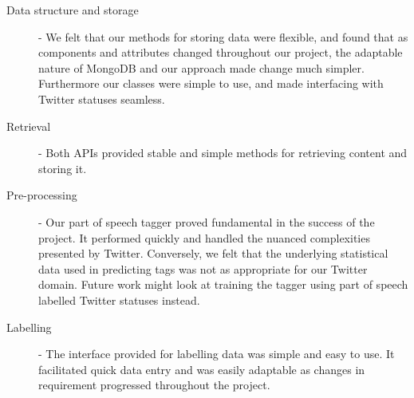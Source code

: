 \begin{description}
	\item [Data structure and storage] - We felt that our methods for storing data were flexible, and found that as components and attributes changed throughout our project, the adaptable nature of MongoDB and our approach made change much simpler. Furthermore our classes were simple to use, and made interfacing with Twitter statuses seamless.
	\item [Retrieval] - Both APIs provided stable and simple methods for retrieving content and storing it.
	\item [Pre-processing] - Our part of speech tagger proved fundamental in the success of the project. It performed quickly and handled the nuanced complexities presented by Twitter. Conversely, we felt that the underlying statistical data used in predicting tags was not as appropriate for our Twitter domain. Future work might look at training the tagger using part of speech labelled Twitter statuses instead.
	\item [Labelling] - The interface provided for labelling data was simple and easy to use. It facilitated quick data entry and was easily adaptable as changes in requirement progressed throughout the project.
\end{description}